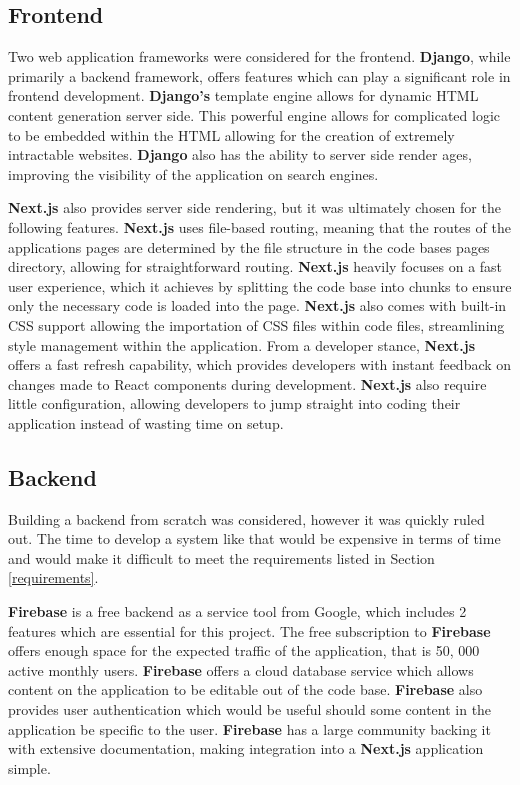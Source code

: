 \documentclass{l4proj}
\begin{document}
\subsection{Frontend}
Two web application frameworks were considered for the frontend. \textbf{Django},  while primarily a backend framework,  offers features which can play a significant role in frontend development. \textbf{Django's} template engine allows for dynamic HTML content generation server side. This powerful engine allows for complicated logic to be embedded within the HTML allowing for the creation of extremely intractable websites. \textbf{Django} also has the ability to server side render ages,  improving the visibility of the application on search engines.

\textbf{Next.js} also provides server side rendering,  but it was ultimately chosen for the following features. \textbf{Next.js} uses file-based routing,  meaning that the routes of the applications pages are determined by the file structure in the code bases pages directory,  allowing for straightforward routing. \textbf{Next.js} heavily focuses on a fast user experience,  which it achieves by splitting the code base into chunks to ensure only the necessary code is loaded into the page. \textbf{Next.js} also comes with built-in CSS support allowing the importation of CSS files within code files,  streamlining style management within the application. From a developer stance,  \textbf{Next.js} offers a fast refresh capability,  which provides developers with instant feedback on changes made to React components during development. \textbf{Next.js} also require little configuration,  allowing developers to jump straight into coding their application instead of wasting time on setup.

\subsection{Backend}
Building a backend from scratch was considered,  however it was quickly ruled out. The time to develop a system like that would be expensive in terms of time and would make it difficult to meet the requirements listed in Section \ref{requirements}.

\textbf{Firebase} is a free backend as a service tool from Google,  which includes 2 features which are essential for this project. The free subscription to \textbf{Firebase} offers enough space for the expected traffic of the application,  that is 50, 000 active monthly users. \textbf{Firebase} offers a cloud database service which allows content on the application to be editable out of the code base. \textbf{Firebase} also provides user authentication which would be useful should some content in the application be specific to the user. \textbf{Firebase} has a large community backing it with extensive documentation,  making integration into a \textbf{Next.js} application simple.
\end{document}
